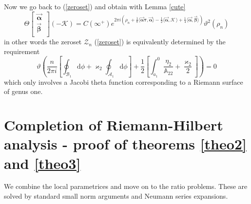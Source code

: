 \documentclass[10pt,oneside,reqno]{amsart}
\numberwithin{equation}{section}
\renewcommand{\d}{{\mathrm d}}
\def\eqref#1{(\ref{#1})}
\begin{document}
Now we go back to \eqref{zeroset} and obtain with Lemma \ref{cute} 
\begin{equation}
  \Theta\begin{bmatrix}
         \vec{\boldsymbol \alpha}\,\\
\vec{\boldsymbol \beta}\,\\
        \end{bmatrix}\left(-\mathcal{K}\right)=C(\infty^+)e^{2\pi i(\rho_n+\frac{1}{8}\langle\vec{\boldsymbol \alpha}{\boldsymbol \tau},\vec{\boldsymbol \alpha}\rangle-\frac{1}{2}
\langle\vec{\boldsymbol \alpha},\mathcal{K}\,\rangle+\frac{1}{4}\langle\vec{\boldsymbol \alpha},\vec{\boldsymbol \beta}\rangle)}\vartheta^2(\rho_n)
\label{g22g1}
\end{equation}
in other words the zeroset $\mathcal Z_n$ \eqref{zeroset} is equivalently determined by the requirement
\begin{equation}\label{zerosetneat}
 \vartheta\left(\frac{n}{2\pi i}\left[\oint_{\mathcal{B}_1}\d\phi+\varkappa_2\oint_{\mathcal{A}_1}\d\phi\right]
  +\frac{1}{2}\left[\int_{a_1}^0\frac{\eta_2}{\mathbb{A}_{22}}+\frac{\varkappa_2}{2}\right]\right)=0
\end{equation}
which only involves a Jacobi theta function corresponding to a Riemann surface of genus one. 


\section{Completion of Riemann-Hilbert analysis - proof of theorems \ref{theo2} and \ref{theo3}}\label{sec4}
We combine the local parametrices and move on to the ratio problems. These are solved by standard small norm arguments and Neumann series expansions.
\end{document}
